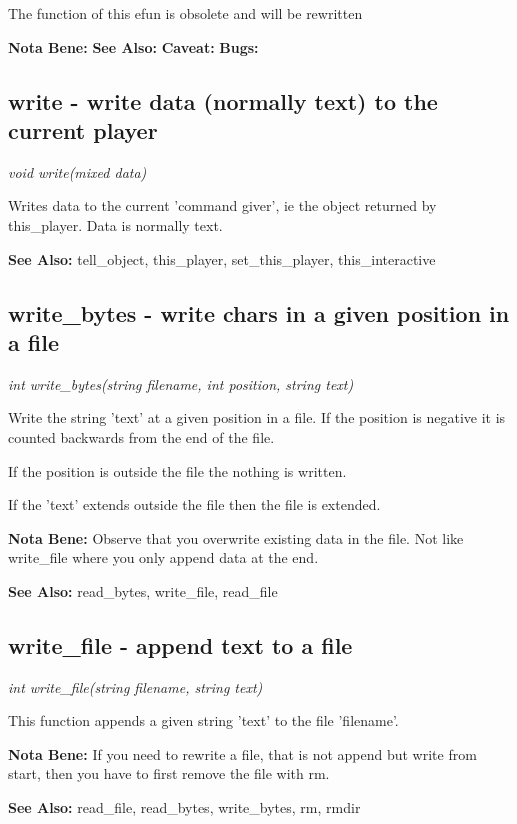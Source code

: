     The function of this efun is obsolete and will be rewritten

    {\bf Nota Bene: }
    {\bf See Also: }
    {\bf Caveat: }
    {\bf Bugs: }

\subsection{write - write data (normally text) to the current player}

    {\em void write(mixed data)}

    Writes data to the current 'command giver', ie the object returned by
    this\_player. Data is normally text.    

    {\bf See Also: }    tell\_object, this\_player, set\_this\_player, this\_interactive


\subsection{write\_bytes - write chars in a given position in a file}

    {\em int write\_bytes(string filename, int position, string text)}

    Write the string 'text' at a given position in a file. If the position
    is negative it is counted backwards from the end of the file.

    If the position is outside the file the nothing is written.

    If the 'text' extends outside the file then the file is extended.

    {\bf Nota Bene: }   Observe that you overwrite existing data in the file. Not like
    write\_file where you only append data at the end.

    {\bf See Also: }    read\_bytes, write\_file, read\_file



\subsection{write\_file - append text to a file}

    {\em int write\_file(string filename, string text)}

    This function appends a given string 'text' to the file 'filename'.

    {\bf Nota Bene: }   If you need to rewrite a file, that is not append but write from
    start, then you have to first remove the file with rm.

    {\bf See Also: }    read\_file, read\_bytes, write\_bytes, rm, rmdir
